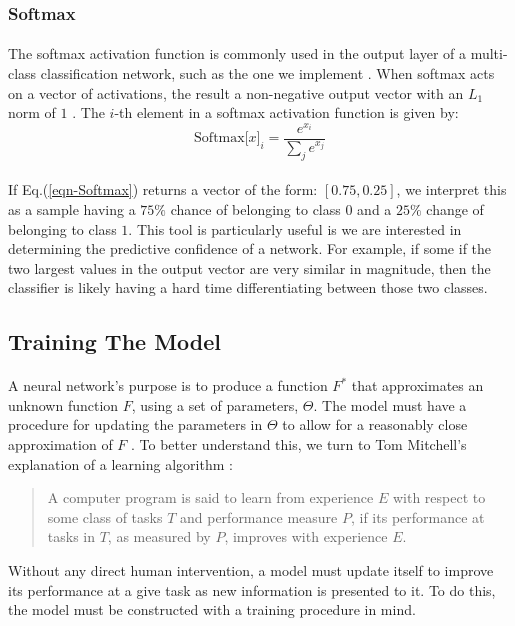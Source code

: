\documentclass[12pt,letterpaper]{article}
\begin{document}

\subsubsection{Softmax}
\label{subsubsec-Softmax}

\paragraph*{}The softmax activation function is commonly used in the output layer of a multi-class classification network, such as the one we implement \cite{Geron,Loy}. When softmax acts on a vector of activations, the result a non-negative output vector with an $L_1$ norm of $1$ \cite{Geron,Goodfellow,Virtanen}. The $i$-th element in a softmax activation function is given by:
\begin{equation}
\label{eqn-Softmax}
\text{Softmax}\big[ x \big]_{i} = \frac{e^{x_i}}{\sum_{j}e^{x_j}}
\end{equation}

\paragraph*{}If Eq.(\ref{eqn-Softmax}) returns a vector of the form: $[ 0.75 , 0.25]$, we interpret this as a sample having a $75\%$ chance of belonging to class $0$ and a $25\%$ change of belonging to class $1$. This tool is particularly useful is we are interested in determining the predictive confidence of a network. For example, if some if the two largest values in the output vector are very similar in magnitude, then the classifier is likely having a hard time differentiating between those two classes.


\subsection{Training The Model}
\label{subsec-Training}

\paragraph*{}A neural network's purpose is to produce a function $F^*$ that approximates an unknown function $F$, using a set of parameters, $\Theta$. The model must have a procedure for updating the parameters in $\Theta$ to allow for a reasonably close approximation of $F$ \cite{Goodfellow}. To better understand this, we turn to Tom Mitchell's explanation of a learning algorithm \cite{Mitchell}:
\begin{quote}
A computer program is said to learn from experience $E$ with respect to some class of tasks $T$ and performance measure $P$, if its performance at tasks in $T$, as measured by $P$, improves with experience $E$.
\end{quote}
Without any direct human intervention, a model must update itself to improve its performance at a give task as new information is presented to it. To do this, the model must be constructed with a training procedure in mind. 
\end{document}
